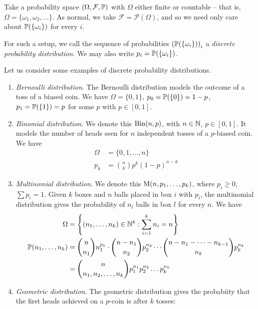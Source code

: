 \documentclass{../template/note}
\begin{document}
    Take a probability space \((\Omega, \mathcal F, \mathbb P)\) with \(\Omega\) either finite or countable -- that is, \(\Omega = \{\omega_1, \omega_2, \dots\}\). As normal, we take \(\mathcal F = \mathcal P(\Omega)\), and so we need only care about \(\mathbb P(\{\omega_i\})\) for every \(i\).

    \begin{definition}
        For such a setup, we call the sequence of probabilities \(\left(\mathbb P(\{\omega_i\})\right)_i\) a \emph{discrete probability distribution}. We may also write \(p_i = \mathbb P(\{\omega_i\})\).
    \end{definition}

    Let us consider some examples of discrete probability distributions.
    
    \begin{enumerate}[label=\protect\circled{\arabic*}]
        \item \emph{Bernoulli distribution}. The Bernoulli distribution models the outcome of a toss of a biased coin. We have \(\Omega = \{0, 1\}\), \(p_0 = \mathbb P(\{0\}) = 1 - p\), \(p_1 = \mathbb P(\{1\}) = p\) for some \(p\) with \(p \in [0, 1]\).
        \item \emph{Binomial distribution}. We denote this \(\operatorname{Bin}(n, p)\), with \(n \in \mathbb N\), \(p \in [0, 1]\). It models the number of heads seen for \(n\) independent tosses of a \(p\)-biased coin. We have
        \begin{align*}
            \Omega &= \{0, 1, \dots, n\} \\
            p_k &= \binom n k p^k (1-p)^{n-k} 
        \end{align*}
        \item \emph{Multinomial distribution}. We denote this \(\operatorname{M}(n, p_1, \dots, p_k)\), where \(p_i \geq 0\), \(\sum p_i = 1\). Given \(k\) boxes and \(n\) balls placed in box \(i\) with \(p_i\), the multinomial distribution gives the probability of \(n_l\) balls in box \(l\) for every \(n\). We have
        \begin{align*}
            \Omega &= \left\{(n_1, \dots, n_k) \in \mathbb N^k: \sum_{i=1}^k n_i = n\right\} \\
            \mathbb P(n_1, \dots, n_k) &= \binom n {n_1} n_1^{p_1} \cdot \binom {n-n_1}{n_2} p_2^{n_2} \cdots \binom{n-n_1-\dots-n_{k-1}}{n_k} p_k^{n_k} \\
            &= \binom n {n_1, n_2, \dots, n_k} p_1^{n_1} p_2^{n_2} \dots p_k^{n_k}
        \end{align*}
        \item \emph{Geometric distribution}. The geometric distribution gives the probabiity that the first heads achieved on a \(p\)-coin is after \(k\) tosses:

\end{enumerate}
\end{document}
